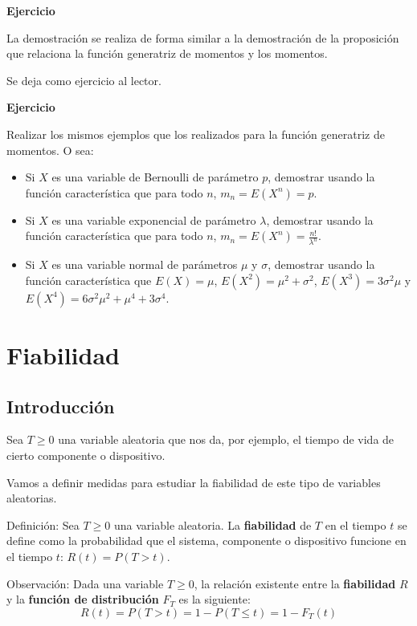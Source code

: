 \documentclass[]{book}
\begin{document}
\textbf{Ejercicio}

La demostración se realiza de forma similar a la demostración de la proposición que relaciona la función generatriz de momentos y los momentos.

Se deja como ejercicio al lector.

\textbf{Ejercicio}

Realizar los mismos ejemplos que los realizados para la función generatriz de momentos. O sea:

\begin{itemize}
\item
  Si \(X\) es una variable de Bernoulli de parámetro \(p\), demostrar usando la función característica que para todo \(n\), \(m_n = E\left(X^n\right)=p\).
\item
  Si \(X\) es una variable exponencial de parámetro \(\lambda\), demostrar usando la función característica que para todo \(n\), \(m_n = E\left(X^n\right)=\frac{n!}{\lambda^n}\).
\item
  Si \(X\) es una variable normal de parámetros \(\mu\) y \(\sigma\), demostrar usando la función característica que \(E(X)=\mu\), \(E\left(X^2\right)=\mu^2+\sigma^2\), \(E\left(X^3\right)=3\sigma^2\mu\) y \(E\left(X^4\right)=6\sigma^2\mu^2+\mu^4+3\sigma^4\).
\end{itemize}

\hypertarget{fiabilidad}{%
\section{Fiabilidad}\label{fiabilidad}}

\hypertarget{introducciuxf3n-1}{%
\subsection{Introducción}\label{introducciuxf3n-1}}

Sea \(T\geq 0\) una variable aleatoria que nos da, por ejemplo, el tiempo de vida de cierto componente o dispositivo.

Vamos a definir medidas para estudiar la fiabilidad de este tipo de variables aleatorias.

Definición:
Sea \(T\geq 0\) una variable aleatoria. La \textbf{fiabilidad} de \(T\) en el tiempo \(t\) se define como la probabilidad que el sistema, componente o dispositivo funcione en el tiempo \(t\): \(R(t)=P(T>t)\).

Observación:
Dada una variable \(T\geq 0\), la relación existente entre la \textbf{fiabilidad} \(R\) y la \textbf{función de distribución} \(F_T\) es la siguiente:
\[
R(t)=P(T>t)=1-P(T\leq t)=1-F_T (t)
\]
\end{document}
